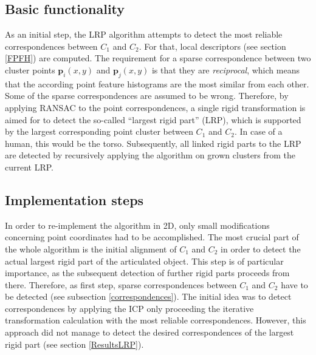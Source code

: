 \subsection{Basic functionality}
\label{functionalityLRP}
As an initial step, the LRP algorithm  attempts to detect the most reliable correspondences between $C_1$ and $C_2$. For that, local descriptors (see section \ref{FPFH}) are computed. The requirement for a sparse correspondence between two cluster points $\boldsymbol{p}_i(x,y)$ and $\boldsymbol{p}_j(x,y)$ is that they are \textit{reciprocal}, which means that the according point feature histograms are the most similar from each other. Some of the sparse correspondences are assumed to be wrong. Therefore, by applying RANSAC to the point correspondences, a single rigid transformation is aimed for to detect the so-called ``largest rigid part'' (LRP), which is supported by the largest corresponding point cluster between $C_1$ and $C_2$. In case of a human, this would be the torso. Subsequently, all linked rigid parts to the LRP are detected by recursively applying the algorithm on grown clusters from the current LRP.

\subsection{Implementation steps}

In order to re-implement the algorithm in 2D, only small modifications concerning point coordinates had to be accomplished. The most crucial part of the whole algorithm is the initial alignment of $C_1$ and $C_2$ in order to detect the actual largest rigid part of the articulated object. This step is of particular importance, as the subsequent detection of further rigid parts proceeds from there. Therefore, as first step, sparse correspondences between $C_1$ and $C_2$ have to be detected (see subsection \ref{correspondences}). The initial idea was to detect correspondences by applying the ICP only proceeding the iterative transformation calculation with the most reliable correspondences. However, this approach did not manage to detect the desired correspondences of the largest rigid part (see section \ref{ResultsLRP}).

